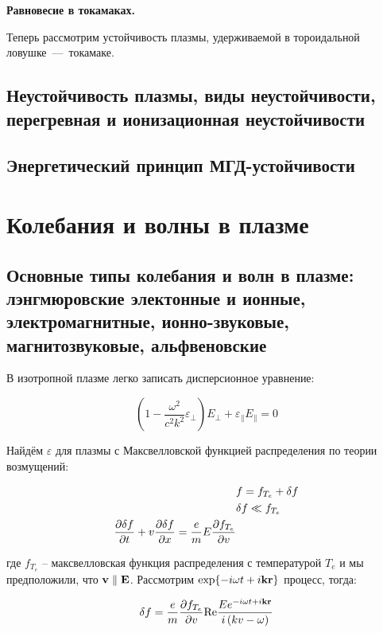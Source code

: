 \documentclass[10pt, a4paper]{article}
\let\stdsection\section
\renewcommand\section{\newpage\stdsection}
\begin{document}
\vspace{5mm}
\textbf{Равновесие в токамаках.}

Теперь рассмотрим устойчивость плазмы, удерживаемой в тороидальной ловушке~---~токамаке.

\subsection{Неустойчивость плазмы, виды неустойчивости, перегревная и ионизационная неустойчивости}

\subsection{Энергетический принцип МГД-устойчивости}

\section{Колебания и волны в плазме}

\subsection{Основные типы колебания и волн в плазме: лэнгмюровские электонные и ионные, электромагнитные, ионно-звуковые, магнитозвуковые, альфвеновские}

В изотропной плазме легко записать дисперсионное уравнение:

\begin{equation}
    \left(1-\frac{\omega^2}{c^2 k^2} \varepsilon_{\perp}\right) E_{\perp} + \varepsilon_{\parallel} E_{\parallel}= 0
\end{equation}

Найдём $\varepsilon$ для плазмы с Максвелловской функцией распределения по теории возмущений:

\begin{align*}
	& f = f_{T_e} + \delta f \\
	& \delta f \ll f_{T_e} \\
	\pdv{\delta f}{t} + v\pdv{\delta f}{x} = \frac{e}{m}E \pdv{f_{T_e}}{v}
\end{align*}

где $f_{T_e}$ -- максвелловская функция распределения с температурой $T_e$ и мы предположили, что $\vb{v} \parallel \vb{E}$. Рассмотрим $\exp{-i\omega t + i \vb{kr}}$ процесс, тогда:

\begin{equation*}
	\delta f = \frac{e}{m}\pdv{f_{T_e}}{v}\text{Re}\frac{Ee^{-i\omega t + i \vb{kr}}}{i\left( kv - \omega \right)}
\end{equation*}
\end{document}
